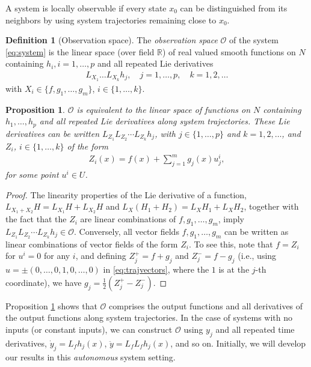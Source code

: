 \documentclass[psamsfonts]{amsart}
\newtheorem{prop}[thm]{Proposition}
\theoremstyle{definition}
\newtheorem{defn}[thm]{Definition}
\theoremstyle{remark}
\newcommand*\R{\mathds{R}}
\numberwithin{equation}{section}
\begin{document}
A system is locally observable if every state $x_0$ can be distinguished from its neighbors by using system trajectories remaining close to $x_0$. 

\begin{defn}[Observation space]
    The \textit{observation space} $\mathscr{O}$ of the system \eqref{eq:system} is the linear space (over field $\R$) of real valued smooth functions on $N$ containing $h_i, i = 1, \dots, p$ and all repeated Lie derivatives 
    \begin{align}
        L_{X_1}\dots L_{X_k}h_j, \quad j = 1,\dots, p, \quad k = 1,2, \dots
    \end{align}
    with $X_i \in \{f, g_1, \dots, g_m\}$, $i\in\{1, \dots, k\}$. 
\end{defn}

\begin{prop}\label{prop:O-space-equiv}
$\mathscr{O}$ is equivalent to the linear space of functions on $N$ containing $h_1, \dots, h_p$ and all repeated Lie derivatives along system trajectories. These Lie derivatives can be written $L_{Z_1}L_{Z_2}\cdots L_{Z_k}h_j$, with $j \in \{1, \dots, p\}$ and $k=1, 2, \dots$, and $Z_i$, $i\in \{1, \dots, k\}$ of the form
\begin{align}\label{eq:trajvectors}
Z_i(x) = f(x) + \sum_{j = 1}^{m}g_j(x)u_j^i,
\end{align} 
for some point $u^i \in U$. 
\end{prop}
\begin{proof}
The linearity properties of the Lie derivative of a function, $L_{X_1+X_2}H = L_{X_1}H+L_{X_2}H$ and $L_X(H_1+H_2) = L_XH_1 + L_XH_2$, together with the fact that the $Z_i$ are linear combinations of $f, g_1, \dots, g_m$, imply $L_{Z_1}L_{Z_2}\cdots L_{Z_k}h_j \in \mathscr{O}$. Conversely, all vector fields $f, g_1, \dots, g_m$ can be written as linear combinations of vector fields of the form $Z_i$. To see this, note that $f = Z_i$ for $u^i = 0$ for any $i$, and defining $Z_{j}^{+} = f+g_j$ and $Z_{j}^{-} = f-g_j$ (i.e., using $u = \pm (0, \dots, 0, 1, 0, \dots, 0)$ in \eqref{eq:trajvectors}, where the $1$ is at the $j$-th coordinate), we have $g_j = \frac{1}{2}(Z_{j}^{+}-Z_{j}^{-})$.  
\end{proof}

Proposition \ref{prop:O-space-equiv} shows that $\mathscr{O}$ comprises the output functions and all derivatives of the output functions along system trajectories. In the case of systems with no inputs (or constant inputs), we can construct $\mathscr{O}$ using $y_j$ and all repeated time derivatives, $\dot y_j = L_fh_j(x)$, $\ddot y = L_fL_fh_j(x)$, and so on. Initially, we will develop our results in this \textit{autonomous} system setting. 
\end{document}
